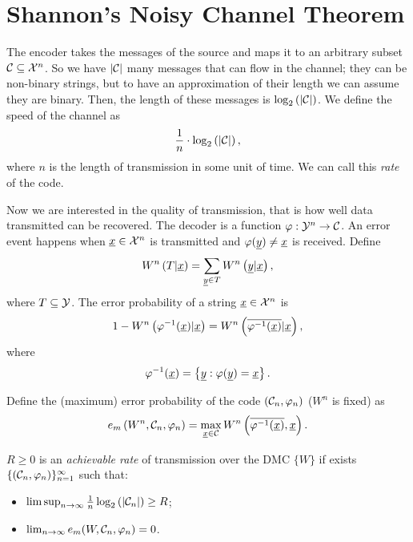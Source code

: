 \section{Shannon's Noisy Channel Theorem}

The encoder takes the messages of the source and maps it to an arbitrary subset $\mathcal{C} \subseteq \mathcal{X}^n$.
So we have $\left|{\mathcal{C}}\right|$ many messages that can flow in the channel; they can be non-binary strings, but to have an approximation of their length we can assume they are binary.
Then, the length of these messages is $\log_2 \left( {\left|{\mathcal{C}}\right|} \right)$.
We define the speed of the channel as
\begin{equation*}
	\frac{1}{n} \cdot \log_2 \left( {\left|{\mathcal{C}}\right|} \right),
\end{equation*}
where $n$ is the length of transmission in some unit of time.
We can call this \emph{rate} of the code.

Now we are interested in the quality of transmission, that is how well data transmitted can be recovered.
The decoder is a function $\varphi: \mathcal{Y}^n \to \mathcal{C}$.
An error event happens when $\underline{x} \in \mathcal{X}^n$ is transmitted and $\varphi(\underline{y}) \neq \underline{x}$ is received.
Define
\begin{equation*}
	W^n \left( T|\underline{x} \right)
	=
	\sum_{\underline{y} \in T} W^n \left( \underline{y}|\underline{x} \right),
\end{equation*}
where $T \subseteq \mathcal{Y}$.
The error probability of a string $\underline{x} \in \mathcal{X}^n$ is
\begin{equation*}
	1 - W^n \left( \varphi^{-1}(\underline{x}) | \underline{x} \right)
	=
	W^n \left( \overline{\varphi^{-1}(\underline{x})} | \underline{x} \right),
\end{equation*}
where
\begin{equation*}
	\varphi^{-1}(\underline{x}) = \left\{ \underline{y} : \varphi(\underline{y}) = \underline{x} \right\}.
\end{equation*}

Define the (maximum) error probability of the code $(\mathcal{C}_n, \varphi_n)$ ($W^n$ is fixed) as 
\begin{equation*}
	e_m \left( W^n, \mathcal{C}_n, \varphi_n \right)
	=
	\max_{\underline{x} \in \mathcal{C}} W^n \left( \overline{\varphi^{-1}(\underline{x})}, \underline{x} \right).
\end{equation*}

\begin{prop}
	$R \geq 0$ is an \emph{achievable rate} of transmission over the \ac{DMC} $\{ W \}$ if exists $\{(\mathcal{C}_n, \varphi_n)\}_{n=1}^\infty$ such that:
	\begin{itemize}
		\item $\limsup_{n \to \infty} \frac{1}{n} \log_2 \left( {\left|{\mathcal{C}_n}\right|} \right) \ge R$;
		\item $\lim_{n \to \infty} e_m(W, \mathcal{C}_n, \varphi_n) = 0$.
	\end{itemize}
\end{prop}

